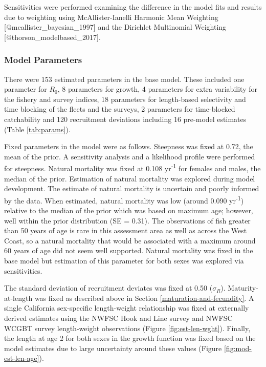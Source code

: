 \documentclass[11pt,
  letterpaper,
]{article}
\begin{document}
Sensitivities were performed examining the difference in the model fits and results due to weighting using McAllister-Ianelli Harmonic Mean Weighting {[}@mcallister\_bayesian\_1997{]} and the Dirichlet Multinomial Weighting {[}@thorson\_modelbased\_2017{]}.

\subsubsection{Model Parameters}\label{model-parameters}

There were 153 estimated parameters in the base model. These included one parameter for \(R_0\), 8 parameters for growth, 4 parameters for extra variability for the fishery and survey indices, 18 parameters for length-based selectivity and time blocking of the fleets and the surveys, 2 parameters for time-blocked catchability and 120 recruitment deviations including 16 pre-model estimates (Table \ref{tab:params}).

Fixed parameters in the model were as follows. Steepness was fixed at 0.72, the mean of the prior. A sensitivity analysis and a likelihood profile were performed for steepness. Natural mortality was fixed at 0.108 yr\textsuperscript{-1} for females and males, the median of the prior. Estimation of natural mortality was explored during model development. The estimate of natural mortality is uncertain and poorly informed by the data. When estimated, natural mortality was low (around 0.090 yr\textsuperscript{-1}) relative to the median of the prior which was based on maximum age; however, well within the prior distribution (SE = 0.31). The observations of fish greater than 50 years of age is rare in this assessment area as well as across the West Coast, so a natural mortality that would be associated with a maximum around 60 years of age did not seem well supported. Natural mortality was fixed in the base model but estimation of this parameter for both sexes was explored via sensitivities.

The standard deviation of recruitment deviates was fixed at 0.50 (\(\sigma_R\)). Maturity-at-length was fixed as described above in Section \ref{maturation-and-fecundity}. A single California sex-specific length-weight relationship was fixed at externally derived estimates using the NWFSC Hook and Line survey and NWFSC WCGBT survey length-weight observations (Figure \ref{fig:est-len-wght}). Finally, the length at age 2 for both sexes in the growth function was fixed based on the model estimates due to large uncertainty around these values (Figure \ref{fig:mod-est-len-age}).
\end{document}
